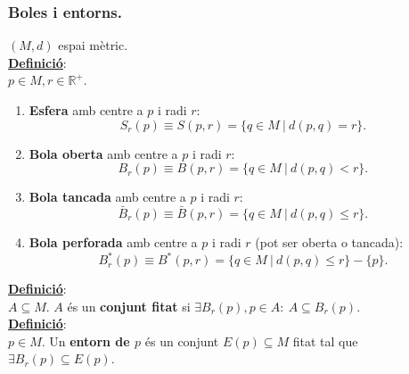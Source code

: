 \documentclass[11pt]{article}
\newcommand{\undbf}[1]{\underline{\textbf{#1}}:\\}
\newcommand{\defi}{\undbf{Definició}}
\newcommand{\ball}[2]{B_{#1}(#2)}
\begin{document}
\subsubsection{Boles i entorns.}
$(M,d)$ espai mètric.\\
\defi $p\in M,r\in\mathbb{R}^+$.
\begin{enumerate}
	\item \textbf{Esfera} amb centre a $p$ i radi $r$:
	$$
	S_r(p)\equiv S(p,r)=\{q\in M\ \vert\ d(p,q)=r\}.
	$$
	\item \textbf{Bola oberta} amb centre a $p$ i radi $r$:
	$$
	\ball{r}{p}\equiv B(p,r)=\{q\in M\ \vert\ d(p,q)<r\}.
	$$
	\item \textbf{Bola tancada} amb centre a $p$ i radi $r$:
	$$
	\bar{B}_r(p)\equiv\bar{B}(p,r)=\{q\in M\ \vert\ d(p,q)\leq r\}.
	$$
	\item \textbf{Bola perforada} amb centre a $p$ i radi $r$ (pot ser oberta o tancada):
	$$
	B^*_r(p)\equiv B^*(p,r)=\{q\in M\ \vert\ d(p,q)\leq r\}-\{p\}.
	$$
\end{enumerate}
\defi $A\subseteq M$. $A$ és un \textbf{conjunt fitat} si $\exists B_r(p),p\in A:\ A\subseteq B_r(p)$.\\
\defi $p\in M$. Un \textbf{entorn de $p$} és un conjunt $E(p)\subseteq M$ fitat tal que $\exists B_r(p)\subseteq E(p)$.
\newpage

\newpage
\end{document}
